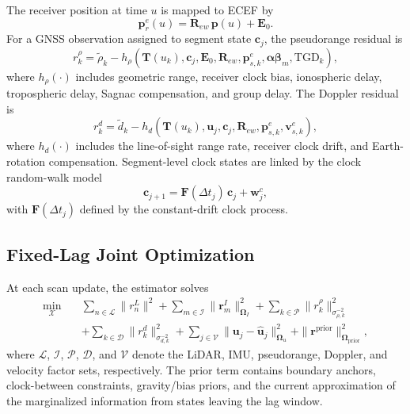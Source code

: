 \documentclass[journal]{IEEEtran}
\begin{document}
The receiver position at time $u$ is mapped to ECEF by
\begin{equation}
\mathbf{p}^{e}_r(u) = \mathbf{R}_{ew}\,\mathbf{p}(u) + \mathbf{E}_0.
\label{eq:ecef_receiver_position}
\end{equation}
For a GNSS observation assigned to segment state $\mathbf{c}_j$, the
pseudorange residual is
\begin{equation}
r^{\rho}_{k} =
\tilde{\rho}_k -
h_{\rho}\!\left(
\mathbf{T}(u_k), \mathbf{c}_j, \mathbf{E}_0, \mathbf{R}_{ew},
\mathbf{p}^{e}_{s,k}, \bm{\alpha\beta}_m, \mathrm{TGD}_k
\right),
\label{eq:ct_pr_residual}
\end{equation}
where $h_{\rho}(\cdot)$ includes geometric range, receiver clock bias,
ionospheric delay, tropospheric delay, Sagnac compensation, and group delay.
The Doppler residual is
\begin{equation}
r^{d}_{k} =
\tilde{d}_k -
h_{d}\!\left(
\mathbf{T}(u_k), \mathbf{u}_j, \mathbf{c}_j, \mathbf{R}_{ew},
\mathbf{p}^{e}_{s,k}, \mathbf{v}^{e}_{s,k}
\right),
\label{eq:ct_doppler_residual}
\end{equation}
where $h_d(\cdot)$ includes the line-of-sight range rate, receiver clock drift,
and Earth-rotation compensation. Segment-level clock states are linked by the
clock random-walk model
\begin{equation}
\mathbf{c}_{j+1} = \mathbf{F}(\Delta t_j)\,\mathbf{c}_j + \mathbf{w}^{c}_j,
\label{eq:clock_between}
\end{equation}
with $\mathbf{F}(\Delta t_j)$ defined by the constant-drift clock process.

\subsection{Fixed-Lag Joint Optimization}
\label{sec:fixed_lag}

At each scan update, the estimator solves
\begin{equation}
\begin{aligned}
\min_{\mathcal{X}} \quad
& \sum_{n \in \mathcal{L}} \|r^L_n\|^2
 + \sum_{m \in \mathcal{I}} \|\mathbf{r}^{I}_m\|^2_{\bm{\Omega}_I}
 + \sum_{k \in \mathcal{P}} \|r^{\rho}_{k}\|^2_{\sigma_{\rho,k}^{-2}} \\
& + \sum_{k \in \mathcal{D}} \|r^{d}_{k}\|^2_{\sigma_{d,k}^{-2}}
 + \sum_{j \in \mathcal{V}} \|\mathbf{u}_j - \hat{\mathbf{u}}_j\|^2_{\bm{\Omega}_u}
 + \|\mathbf{r}^{\mathrm{prior}}\|^2_{\bm{\Omega}_{\mathrm{prior}}},
\end{aligned}
\label{eq:joint_objective}
\end{equation}
where $\mathcal{L}$, $\mathcal{I}$, $\mathcal{P}$, $\mathcal{D}$, and
$\mathcal{V}$ denote the LiDAR, IMU, pseudorange, Doppler, and velocity factor
sets, respectively. The prior term contains boundary anchors, clock-between
constraints, gravity/bias priors, and the current approximation of the
marginalized information from states leaving the lag window.
\end{document}
